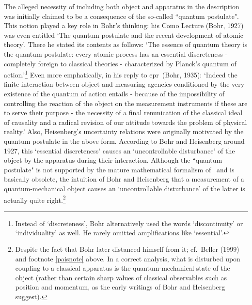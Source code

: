 \documentclass[12pt,titlepage]{article}
\newcommand{\epr}{{\sc epr}}
\begin{document}
The alleged necessity of including both object and apparatus in the description was initially claimed to be a consequence of the so-called ``quantum postulate". This notion played a key role in Bohr's thinking: his  Como Lecture (Bohr, 1927) was even entitled `The quantum postulate and the recent development of atomic theory'.  There he stated
its contents as follows:  `The essence of quantum theory is the quantum postulate: every atomic process has an essential discreteness -  completely foreign to classical theories - characterized by Planck's quantum of action.'\footnote{Instead of `discreteness', Bohr alternatively used the words  `discontinuity' or `individuality' as well. He rarely omitted amplifications like `essential'.} Even more emphatically, in his reply to \epr\ (Bohr, 1935):
`Indeed the finite interaction between object and measuring agencies conditioned by the very existence of the  quantum of action entails - because of the impossibility of controlling the reaction of the object on the measurement instruments if these are to serve their purpose - the necessity of a final renunication of the classical ideal of causality and a radical revision of our attitude towards the problem of physical reality.'
  Also, Heisenberg's uncertainty relations were originally motivated by the quantum postulate in the above form.
According to Bohr and Heisenberg around 1927, this `essential discreteness' causes an 
`uncontrollable disturbance' of the object by the apparatus during their interaction.
Although the ``quantum postulate" is not supported by the mature mathematical formalism of \qm\ and is basically obsolete, the intuition of Bohr and Heisenberg that a measurement of a quantum-mechanical object causes an `uncontrollable disturbance' of the latter is actually quite right.\footnote{Despite the fact that  Bohr later distanced himself from it; cf.\ Beller (1999) and footnote  \ref{paisnote} above. In a correct analysis, what is disturbed upon coupling to a classical apparatus is the quantum-mechanical state of the object (rather than certain sharp values of  classical observables such as position and momentum, as the early writings of Bohr and Heisenberg suggest). } 
\end{document}

